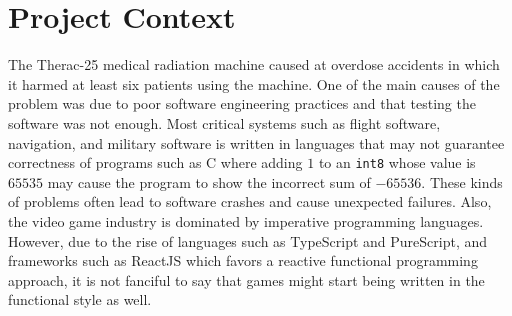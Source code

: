 






\section{Project Context}
The Therac-25 medical radiation machine caused at overdose accidents in which it harmed at least six patients using the machine.
One of the main causes of the problem was due to poor software engineering practices and that testing the software was
not enough.\cite{Therac1}
Most critical systems such as flight software, navigation, and military software is written in languages that may not guarantee 
correctness of programs such as C where adding $1$ to an \verb|int8| whose value is $65535$ may cause the program to show the 
incorrect sum of $-65536$. These kinds of problems often lead to software crashes and cause unexpected failures.
Also, the video game industry is dominated by imperative programming languages. However, due to the rise of 
languages such as TypeScript and PureScript, and frameworks such as ReactJS which favors a reactive functional programming approach,
it is not fanciful to say that games might start being written in the functional style as well. 

